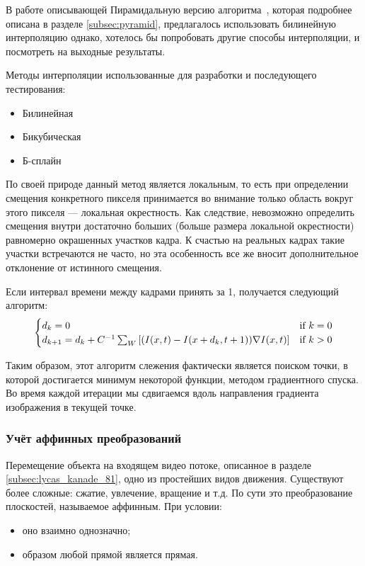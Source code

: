 В работе описывающей Пирамидальную версию алгоритма~\cite{Bouguet2000}, которая подробнее описана в разделе \ref{subsec:pyramid}, предлагалось использовать билинейную интерполяцию однако, хотелось бы попробовать другие способы интерполяции, и посмотреть на выходные результаты.

Методы интерполяции использованные для разработки и последующего тестирования:
\begin{itemize}
\item Билинейная
\item Бикубическая
\item Б-сплайн
\end{itemize}

По своей природе данный метод является локальным, то есть при определении смещения конкретного пикселя принимается во внимание только область вокруг этого пикселя — локальная окрестность. Как следствие, невозможно определить смещения внутри достаточно больших (больше размера локальной окрестности) равномерно окрашенных участков кадра. К счастью на реальных кадрах такие участки встречаются не часто, но эта особенность все же вносит дополнительное отклонение от истинного смещения.

Если интервал времени между кадрами принять за 1, получается следующий алгоритм:
\begin{equation}
\numberwithin{equation}{section}
\label{eq:alg_pyr}
\begin{cases} d_k = 0 &\mbox{if } k = 0 \\
d_{k+1}=d_k + C^{-1} \sum_W \left[ (I(x,t) - I(x+d_k,t + 1)) \nabla I (x,t) \right] & \mbox{if } k > 0 \end{cases}
\end{equation}

Таким образом, этот алгоритм слежения фактически является поиском точки, в которой достигается минимум некоторой функции, методом градиентного спуска. Во время каждой итерации мы сдвигаемся вдоль направления градиента изображения в текущей точке.
\subsubsection{Учёт аффинных преобразований}
Перемещение объекта на входящем видео потоке, описанное в разделе \ref{subsec:lycas_kanade_81}, одно из простейших видов движения. Существуют более сложные: сжатие, увлечение, вращение и т.д. По сути это преобразование плоскостей, называемое аффинным. При условии:
\begin{itemize}
\item оно взаимно однозначно;
\item образом любой прямой является прямая.
\end{itemize}

